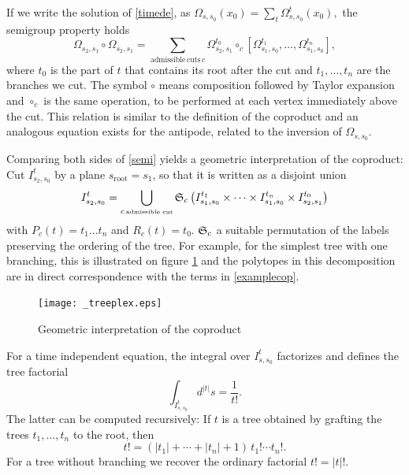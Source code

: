\documentclass[10pt,here,feynmf]{article}
\begin{document}
If we write the solution of \eqref{timede}, as 
$
\Omega_{s, s_{0}}(x_{0})=\sum_t\Omega^{t}_{s,s_0}(x_{0}), 
$
the semigroup property holds
\begin{equation}
\Omega_{s_{2},s_{1}}\circ\Omega_{s_{2},s_{1}}=\sum_{\mathrm{admissible}\,\mathrm{cuts}\,c}
\Omega^{t_{0}}_{s_{2},s_{1}}\circ_{c}
\left[\Omega^{t_{1}}_{s_{1},s_{0}},\dots,\Omega^{t_{n}}_{s_{1},s_{0}}\right],\label{semi}
\end{equation}
where $t_{0}$ is the part of $t$ that contains its root after the cut and $t_{1},\dots,t_{n}$ are the branches we cut. The symbol $\circ$ means composition followed by Taylor expansion and $\circ_{c}$ is the same operation, to be performed at each vertex immediately above the cut. This relation is similar to the definition of the coproduct and an analogous equation exists for the antipode, related to the inversion of $\Omega_{s,s_{0}}$.


Comparing both sides of \eqref{semi} yields a geometric interpretation of the coproduct:
Cut $I_{s_{2},s_{0}}^{t}$ by a plane $s_{\mathrm{root}}=s_{1}$, so that it is written as a disjoint union
\begin{equation}
I_{s_{2},s_{0}}^{t}=\bigcup_{c\,\mbox{\tiny{admissible cut}}}{\frak
S}_{c}\left( I_{s_{1},s_{0}}^{t_{1}}\times\dots\times
I_{s_{1},s_{0}}^{t_{n}}\times I_{s_{2},s_{1}}^{t_{0}}\right)
\end{equation}
with $P_{c}(t)=t_{1}\dots t_{n}$ and $R_{c}(t)=t_{0}$. ${\frak
S}_{c}$ a suitable permutation of the labels preserving the ordering of the
tree. For example, for the simplest tree with one branching, this is illustrated on figure \ref{geometricinter} and the polytopes in this decomposition are in direct correspondence with the terms in \eqref{examplecop}. 



\begin{figure}
\begin{center}
\texttt{[image: \_treeplex.eps]}
\caption{Geometric interpretation of the coproduct}
\label{geometricinter}
\end{center}
\end{figure}

For a time independent equation, the integral over $I^{t}_{s,s_{0}}$ factorizes and defines the tree factorial
\begin{equation}
\int_{I^{t}_{s,s_{0}}}d^{|t|}s=\frac{1}{t!}.
\end{equation}
The latter can be computed recursively: If $t$ is a tree obtained by grafting the trees $t_{1},\dots,t_{n}$ to the root, then
\begin{equation}
t!=\left(|t_{1}|+\cdots+|t_{n}|+1\right)\,t_{1}!\cdots t_{n}!.
\end{equation}
For a tree without branching we recover the ordinary factorial $t!=|t|!$. 
\end{document}
